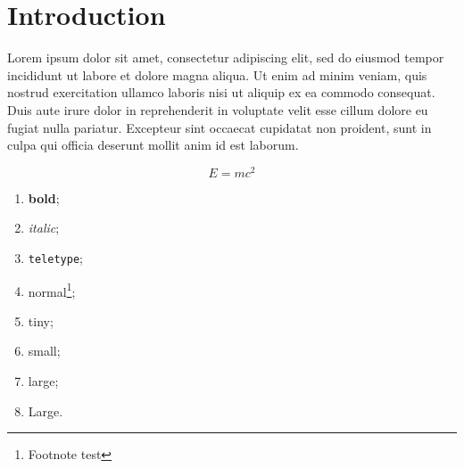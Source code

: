 \section{Introduction}

Lorem ipsum dolor sit amet, consectetur adipiscing elit, sed do eiusmod tempor incididunt ut labore et dolore magna aliqua. Ut enim ad minim veniam, quis nostrud exercitation ullamco laboris nisi ut aliquip ex ea commodo consequat. Duis aute irure dolor in reprehenderit in voluptate velit esse cillum dolore eu fugiat nulla pariatur. Excepteur sint occaecat cupidatat non proident, sunt in culpa qui officia deserunt mollit anim id est laborum.


\begin{equation}
  \label{eq:eq}
  E = mc^2
\end{equation}

\begin{enumerate}
\item {\bf bold};
\item {\it italic};
\item {\tt teletype};
\item normal\footnote{Footnote test};
\item {\tiny tiny};
\item {\small small};
\item {\large large};
\item {\Large Large}.
\end{enumerate}
